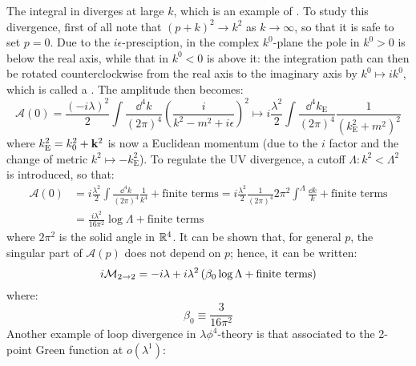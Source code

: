 The integral in  diverges at large $ k $, which is an example of . To study this divergence, first of all note that $ (p + k)^2 \rightarrow k^2 $ as $ k \rightarrow \infty $, so that it is safe to set $ p = 0 $. Due to the $ i\epsilon $-presciption, in the complex $ k^0 $-plane the pole in $ k^0 > 0 $ is below the real axis, while that in $ k^0 < 0 $ is above it: the integration path can then be rotated counterclockwise from the real axis to the imaginary axis by $ k^0 \mapsto i k^0 $, which is called a . The amplitude then becomes:
\begin{equation*}
  \mathcal{A}(0) = \frac{(-i \lambda)^2}{2} \int \frac{\dd^4k}{(2\pi)^4} \left( \frac{i}{k^2 - m^2 + i\epsilon} \right)^2 \mapsto i \frac{\lambda^2}{2} \int \frac{\dd^4k_\text{E}}{(2\pi)^4} \frac{1}{(k_\text{E}^2 + m^2)^2}
\end{equation*}
where $ k_\text{E}^2 = k_0^2 + \mathbf{k}^2 $ is now a Euclidean momentum (due to the $ i $ factor and the change of metric $ k^2 \mapsto -k_\text{E}^2 $). To regulate the UV divergence, a cutoff $ \Lambda : k^2 < \Lambda^2 $ is introduced, so that:
\begin{equation*}
  \begin{split}
    \mathcal{A}(0)
    & = i \frac{\lambda^2}{2} \int \frac{\dd^4k}{(2\pi)^4} \frac{1}{k^4} + \text{finite terms} = i \frac{\lambda^2}{2} \frac{1}{(2\pi)^4} 2\pi^2 \int^\Lambda \frac{\dd k}{k} + \text{finite terms}\\
    & = \frac{i \lambda^2}{16 \pi^2} \log \Lambda + \text{finite terms}
  \end{split}
\end{equation*}
where $ 2\pi^2 $ is the solid angle in $ \mathbb{R}^4 $. It can be shown that, for general $ p $, the singular part of $ \mathcal{A}(p) $ does not depend on $ p $; hence, it can be written:
\begin{equation*}
  i \mathcal{M}_{2 \rightarrow 2} = -i \lambda + i \lambda^2 \left( \beta_0 \log \Lambda + \text{finite terms} \right)
\end{equation*}
where:
\begin{equation}
  \beta_0 \equiv \frac{3}{16 \pi^2}
\end{equation}
Another example of loop divergence in $ \lambda \phi^4 $-theory is that associated to the 2-point Green function at $ o(\lambda^1) $:
